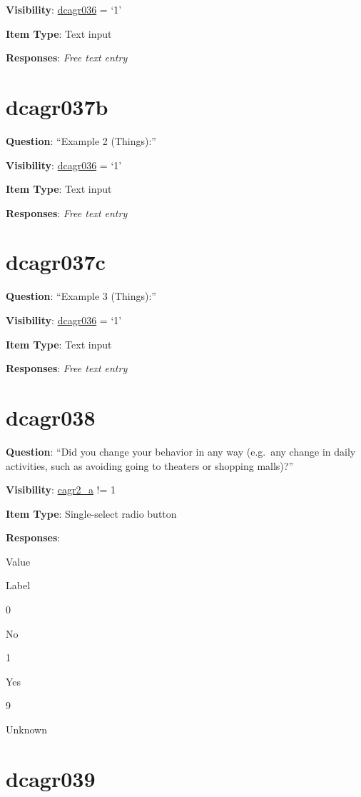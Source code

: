 \documentclass[]{book}
\begin{document}
\textbf{Visibility}: \protect\hyperlink{dcagr036}{dcagr036} = `1'

\textbf{Item Type}: Text input

\textbf{Responses}: \emph{Free text entry}

\hypertarget{dcagr037b}{%
\section{dcagr037b}\label{dcagr037b}}

\textbf{Question}: ``Example 2 (Things):''

\textbf{Visibility}: \protect\hyperlink{dcagr036}{dcagr036} = `1'

\textbf{Item Type}: Text input

\textbf{Responses}: \emph{Free text entry}

\hypertarget{dcagr037c}{%
\section{dcagr037c}\label{dcagr037c}}

\textbf{Question}: ``Example 3 (Things):''

\textbf{Visibility}: \protect\hyperlink{dcagr036}{dcagr036} = `1'

\textbf{Item Type}: Text input

\textbf{Responses}: \emph{Free text entry}

\hypertarget{dcagr038}{%
\section{dcagr038}\label{dcagr038}}

\textbf{Question}: ``Did you change your behavior in any way (e.g.~any change in daily activities, such as avoiding going to theaters or shopping malls)?''

\textbf{Visibility}: \protect\hyperlink{cagr2_a}{cagr2\_a} != 1

\textbf{Item Type}: Single-select radio button

\textbf{Responses}:

Value

Label

0

No

1

Yes

9

Unknown

\hypertarget{dcagr039}{%
\section{dcagr039}\label{dcagr039}}
\end{document}
